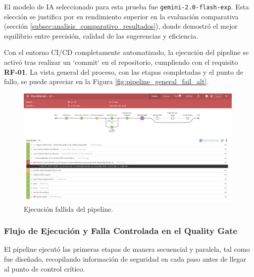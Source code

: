 El modelo de IA seleccionado para esta prueba fue \texttt{gemini-2.0-flash-exp}. Esta elección se justifica por su rendimiento superior en la evaluación comparativa (sección \ref{subsec:analisis_comparativo_resultados}), donde demostró el mejor equilibrio entre precisión, calidad de las sugerencias y eficiencia.

Con el entorno CI/CD completamente automatizado, la ejecución del pipeline se activó tras realizar un `commit` en el repositorio, cumpliendo con el requisito \textbf{RF-01}. La vista general del proceso, con las etapas completadas y el punto de fallo, se puede apreciar en la Figura \ref{fig:pipeline_general_fail_alt}.

\begin{figure}[h]
\centering
\includegraphics[width=0.99\textwidth]{contenido/imagenes/4_pipeline_fail.png}
\caption{Ejecución fallida del pipeline.}
\label{fig:pipeline_general_fail}
\end{figure}

\subsubsection{Flujo de Ejecución y Falla Controlada en el Quality Gate}
El pipeline ejecutó las primeras etapas de manera secuencial y paralela, tal como fue diseñado, recopilando información de seguridad en cada paso antes de llegar al punto de control crítico.

